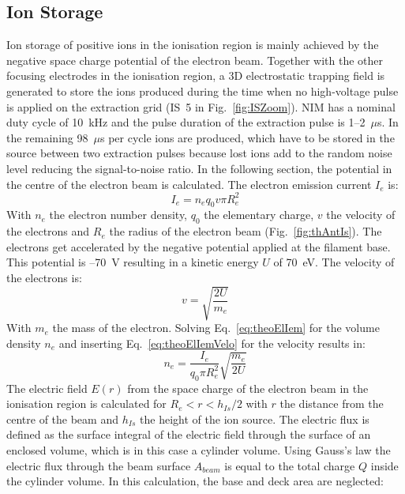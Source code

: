 		
	\subsection{Ion Storage}\label{chap:TheoIonStor}
	Ion storage of positive ions in the ionisation region is mainly achieved by the negative space charge potential of the electron beam. Together with the other focusing electrodes in the ionisation region, a 3D electrostatic trapping field is generated to store the ions produced during the time when no high-voltage pulse is applied on the extraction grid (IS~5 in Fig.~\ref{fig:ISZoom}). NIM has a nominal duty cycle of 10~kHz and the pulse duration of the extraction pulse is 1--2~$\mu$s. In the remaining 98~$\mu$s per cycle ions are produced, which have to be stored in the source between two extraction pulses because lost ions add to the random noise level reducing the signal-to-noise ratio. In the following section, the potential in the centre of the electron beam is calculated. The electron emission current $I_{e}$ is:
	\begin{equation}
		I_{e} = n_e q_0 v\pi R_e^2
		\label{eq:theoElIem}
	\end{equation}
	With $n_e$ the electron number density, $q_0$ the elementary charge, $v$ the velocity of the electrons and $R_e$ the radius of the electron beam (Fig.~\ref{fig:thAntIs}). The electrons get accelerated by the negative potential applied at the filament base. This potential is --70~\si{\volt} resulting in a kinetic energy $U$ of 70~\si{\electronvolt}. The velocity of the electrons is:
	\begin{equation}
		v = \sqrt{\frac{2 U}{m_e}}
		\label{eq:theoElIemVelo}
	\end{equation}
	With $m_e$ the mass of the electron. Solving Eq.~\eqref{eq:theoElIem} for the volume density $n_e$ and inserting Eq.~\eqref{eq:theoElIemVelo} for the velocity results in:
	\begin{equation}
		n_e = \frac{I_e}{q_0 \pi R_e^2}\sqrt{\frac{m_e}{2U}}
		\label{eq:theoElIemNe}
	\end{equation}
	The electric field $E(r)$ from the space charge of the electron beam in the ionisation region is calculated for $R_e<r<h_{Is}/2$ with $r$ the distance from the centre of the beam and $h_{Is}$ the height of the ion source. The electric flux is defined as the surface integral of the electric field through the surface of an enclosed volume, which is in this case a cylinder volume. Using Gauss's law the electric flux through the beam surface $A_{beam}$ is equal to the total charge $Q$ inside the cylinder volume. In this calculation, the base and deck area are neglected:
